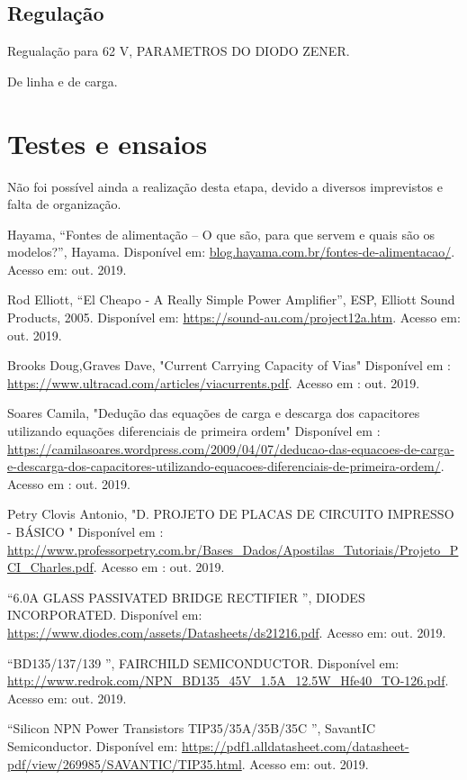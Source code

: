 \documentclass[a4paper,12pt,oneside,openany,table,xcdraw]{article}
\begin{document}
\subsection{Regulação}

Regualação para 62 V, PARAMETROS DO DIODO ZENER.

De linha e de carga.

\section{Testes e ensaios}
Não foi possível ainda a realização desta etapa, devido a diversos imprevistos e falta de organização.


\newpage
\begin{thebibliography}{9} 

    Hayama,
    “Fontes de alimentação – O que são, para que servem e quais são os modelos?”, Hayama.
 Disponível em:
 \url{blog.hayama.com.br/fontes-de-alimentacao/}. Acesso em: out. 2019.

    Rod Elliott,
    “El Cheapo - A Really Simple Power Amplifier”, ESP, Elliott Sound Products, 2005.
 Disponível em:
 \url{https://sound-au.com/project12a.htm}. Acesso em: out. 2019.
 
    Brooks Doug,Graves Dave,
    "Current Carrying Capacity of Vias"
 Disponível em : 
 \url{https://www.ultracad.com/articles/viacurrents.pdf}. Acesso em : out. 2019.
 
    Soares Camila,
 "Dedução das equações de carga e descarga dos capacitores utilizando equações diferenciais de primeira ordem"
  Disponível em : 
 \url{https://camilasoares.wordpress.com/2009/04/07/deducao-das-equacoes-de-carga-e-descarga-dos-capacitores-utilizando-equacoes-diferenciais-de-primeira-ordem/}.
 Acesso em : out. 2019.
 
    Petry Clovis Antonio,
 "D. PROJETO DE PLACAS DE CIRCUITO
IMPRESSO - BÁSICO "
  Disponível em : 
 \url{http://www.professorpetry.com.br/Bases_Dados/Apostilas_Tutoriais/Projeto_PCI_Charles.pdf}. Acesso em : out. 2019.
 
 
        “6.0A GLASS PASSIVATED BRIDGE RECTIFIER
”, DIODES INCORPORATED.
 Disponível em:
 \url{https://www.diodes.com/assets/Datasheets/ds21216.pdf}. Acesso em: out. 2019.
 
    “BD135/137/139
”, FAIRCHILD SEMICONDUCTOR.
 Disponível em:
 \url{http://www.redrok.com/NPN_BD135_45V_1.5A_12.5W_Hfe40_TO-126.pdf}. Acesso em: out. 2019.
 
    “Silicon NPN Power Transistors TIP35/35A/35B/35C ”, SavantIC Semiconductor. 
 Disponível em:
 \url{https://pdf1.alldatasheet.com/datasheet-pdf/view/269985/SAVANTIC/TIP35.html}. Acesso em: out. 2019.
 


\end{thebibliography}
\end{document}
